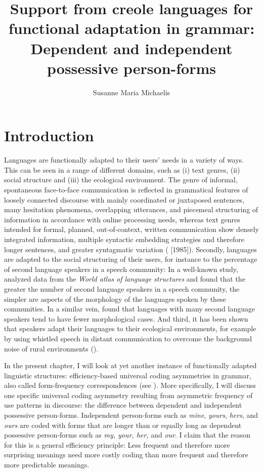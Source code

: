 \documentclass[output=paper]{langsci/langscibook}
\author{Susanne Maria Michaelis\affiliation{Leipzig University \& Max Planck Institute for the Science of Human History (Jena)}}
\title{Support from creole languages for functional adaptation in grammar: Dependent and independent possessive person-forms}
\begin{document}
\maketitle 




\section{Introduction}

Languages are functionally adapted to their users’ needs in a variety of ways. This can be seen in a range of different domains, such as (i) text genres, (ii) social structure and (iii) the ecological environment. The genre of informal, spontaneous face-to-face communication is reflected in grammatical features of loosely connected discourse with mainly coordinated or juxtaposed sentences, many hesitation phenomena, overlapping utterances, and piecemeal structuring of information in accordance with online processing needs, whereas text genres intended for formal, planned, out-of-context, written communication show densely integrated information, multiple syntactic embedding strategies and therefore longer sentences, and greater syntagmatic variation (\citealt{KochOesterreicher2012} [1985]). Secondly, languages are adapted to the social structuring of their users, for instance to the percentage of second language speakers in a speech community: In a well-known study, \citet{LupyanDale2010} analyzed data from the \textit{World atlas of language structures} \citep{HaspelmathEtAl2005} and found that the greater the number of second language speakers in a speech community, the simpler are aspects of the morphology of the languages spoken by these communities. In a similar vein, \citet{BentzWinter2013} found that languages with many second language speakers tend to have fewer morphological cases. And third, it has been shown that speakers adapt their languages to their ecological environments, for example by using whistled speech in distant communication to overcome the background noise of rural environments (\citealt{Meyer2005,Meyer2008}). 

In the present chapter, I will look at yet another instance of functionally adapted linguistic structures: efficiency-based universal coding asymmetries in grammar, also called form-frequency correspondences (see \citealt{Haspelmath2019 [this volume]}). More specifically, I will discuss one specific universal coding asymmetry resulting from asymmetric frequency of use patterns in discourse: the difference between dependent and independent possessive person-forms. Independent person-forms such as \textit{mine}, \textit{yours}, \textit{hers}, and \textit{ours} are coded with forms that are longer than or equally long as dependent possessive person-forms such as \textit{my, your, her,} and \textit{our}. I claim that the reason for this is a general efficiency principle: Less frequent and therefore more surprising meanings need more costly coding than more frequent and therefore more predictable meanings. 
\end{document}

